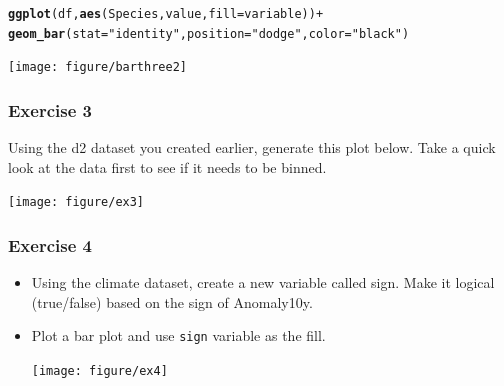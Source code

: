 \documentclass{beamer}\usepackage[]{graphicx}\usepackage[]{color}
\makeatletter
\newcommand{\hlstr}[1]{\textcolor[rgb]{0.192,0.494,0.8}{#1}}%
\newcommand{\hlopt}[1]{\textcolor[rgb]{0,0,0}{#1}}%
\newcommand{\hlstd}[1]{\textcolor[rgb]{0.345,0.345,0.345}{#1}}%
\newcommand{\hlkwc}[1]{\textcolor[rgb]{0.333,0.667,0.333}{#1}}%
\newcommand{\hlkwd}[1]{\textcolor[rgb]{0.737,0.353,0.396}{\textbf{#1}}}%
\newenvironment{kframe}{%
 \def\at@end@of@kframe{}%
 \ifinner\ifhmode%
  \def\at@end@of@kframe{\end{minipage}}%
  \begin{minipage}{\columnwidth}%
 \fi\fi%
 \def\FrameCommand##1{\hskip\@totalleftmargin \hskip-\fboxsep
 \colorbox{shadecolor}{##1}\hskip-\fboxsep
     \hskip-\linewidth \hskip-\@totalleftmargin \hskip\columnwidth}%
 \MakeFramed {\advance\hsize-\width
   \@totalleftmargin\z@ \linewidth\hsize
   \@setminipage}}%
 {\par\unskip\endMakeFramed%
 \at@end@of@kframe}
\newenvironment{knitrout}{}{} %
\makeatother
\begin{document}
\begin{frame}[fragile]
\begin{knitrout}\footnotesize
{}\color{fgcolor}\begin{kframe}
\begin{alltt}
\hlkwd{ggplot}\hlstd{(df,} \hlkwd{aes}\hlstd{(Species, value,} \hlkwc{fill} \hlstd{= variable))} \hlopt{+}
\hlkwd{geom_bar}\hlstd{(}\hlkwc{stat} \hlstd{=} \hlstr{"identity"}\hlstd{,} \hlkwc{position}\hlstd{=}\hlstr{"dodge"}\hlstd{,} \hlkwc{color}\hlstd{=}\hlstr{"black"}\hlstd{)}
\end{alltt}
\end{kframe}

{\centering \texttt{[image: figure/barthree2]} 

}



\end{knitrout}
\end{frame}


\begin{frame}[fragile]
\frametitle{Exercise 3}
Using the d2 dataset you created earlier, generate this plot below. Take a quick look at the data first to see if it needs to be binned.
\begin{knitrout}\footnotesize
{}\color{fgcolor}

{\centering \texttt{[image: figure/ex3]} 

}



\end{knitrout}
\end{frame}


\begin{frame}[fragile]
\frametitle{Exercise 4}
\begin{itemize}
\item Using the climate dataset, create a new variable called sign. Make it logical (true/false) based on the sign of Anomaly10y.
\item Plot a bar plot and use \texttt{sign} variable as the fill.\\
\begin{knitrout}\footnotesize
{}\color{fgcolor}

{\centering \texttt{[image: figure/ex4]} 

}



\end{knitrout}

\end{itemize}
\end{frame}
\end{document}
